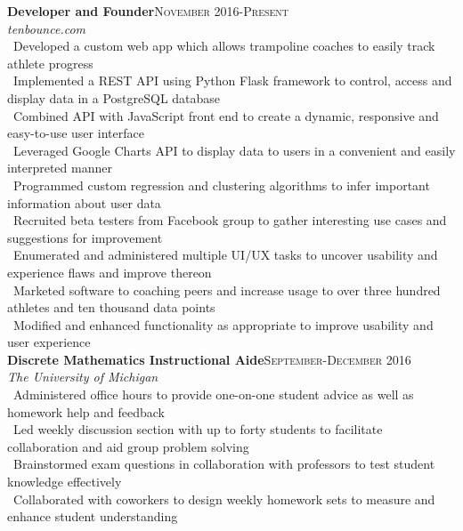 \documentclass[a4paper,10pt]{article}
\renewcommand{\subsection}[2]{{\noindent \textbf{#1}\hfill \textsc{#2}\\}}
\begin{document}
\subsection{Developer and Founder}{November 2016-Present}
\textit{tenbounce.com}\\
\textbullet\ Developed a custom web app which allows trampoline coaches to easily track athlete progress\\
\textbullet\ Implemented a REST API using Python Flask framework to control, access and display data in a PostgreSQL database\\
\textbullet\ Combined API with JavaScript front end to create a dynamic, responsive and easy-to-use user interface\\
\textbullet\ Leveraged Google Charts API to display data to users in a convenient and easily interpreted manner\\
\textbullet\ Programmed custom regression and clustering algorithms to infer important information about user data\\
\textbullet\ Recruited beta testers from Facebook group to gather interesting use cases and suggestions for improvement\\
\textbullet\ Enumerated and administered multiple UI/UX tasks to uncover usability and experience flaws and improve thereon\\
\textbullet\ Marketed software to coaching peers and increase usage to over three hundred athletes and ten thousand data points\\
\textbullet\ Modified and enhanced functionality as appropriate to improve usability and user experience\\

\subsection{Discrete Mathematics Instructional Aide}{September-December 2016}
\textit{The University of Michigan}\\
\textbullet\  Administered office hours to provide one-on-one student advice
 as well as homework help and feedback\\
\textbullet\  Led weekly discussion section with up to forty students to facilitate
 collaboration and aid group problem solving\\
\textbullet\  Brainstormed exam questions in collaboration with professors to test student knowledge effectively\\
\textbullet\  Collaborated with coworkers to design weekly homework sets to measure and enhance student understanding\\
\end{document}

